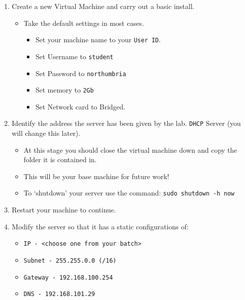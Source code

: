 \documentclass[11pt]{article}
\begin{document}
\begin{enumerate}
    \item Create a new Virtual Machine and carry out a basic install.
        \begin{itemize}
            \item Take the default settings in most cases.
                \begin{itemize}
                    \item Set your machine name to your \texttt{User ID}.
                    \item Set Username to \texttt{student}
                    \item Set Password to \texttt{northumbria}
                    \item Set memory to \texttt{2Gb}
                    \item Set Network card to Bridged.
                \end{itemize}
        \end{itemize}
    \item Identify the address the server has been given by the lab. \texttt{DHCP} Server (you will change this later). 
        \begin{tcolorbox}[title={\textbf{Notes:}}]
            \begin{itemize}
                \item At this stage you should close the virtual machine down and copy the folder it is contained in. 
                \item This will be your base machine for future work!
                \item To `shutdown' your server use the command: \texttt{sudo shutdown -h now} 
            \end{itemize}
        \end{tcolorbox}
    \item Restart your machine to continue.
    \item Modify the server so that it has a static configurations of: 
        \begin{itemize}
            \item \texttt{IP - <choose one from your batch>}
            \item \texttt{Subnet - 255.255.0.0 (/16)}
            \item \texttt{Gateway - 192.168.100.254}
            \item \texttt{DNS - 192.168.101.29}
                \begin{tcolorbox}[title={\textbf{Notes:}}]

\end{tcolorbox}
\end{itemize}
\end{enumerate}
\end{document}
